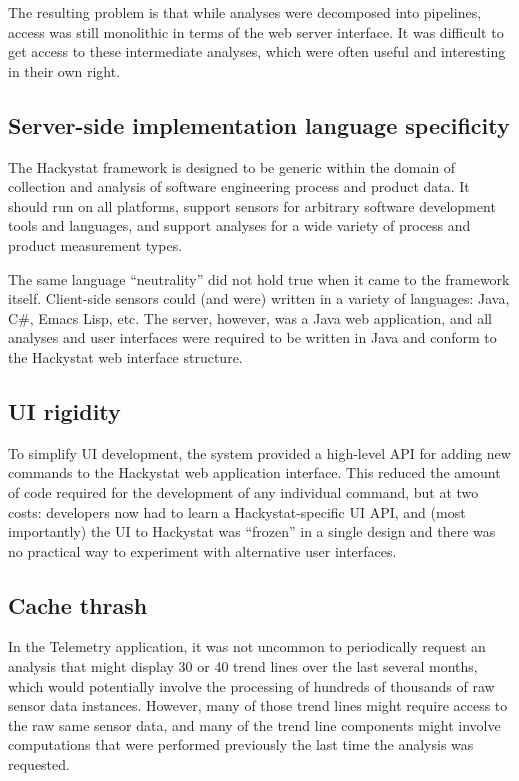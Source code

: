 \documentclass[conference,compsoc,peerreview]{IEEEtran}
\begin{document}
The resulting problem is that while analyses were decomposed into pipelines, access was still monolithic in terms of the web server interface. It was difficult to get access to these intermediate analyses, which were often useful and interesting in their own right. 

\subsection{Server-side implementation language specificity}

The Hackystat framework is designed to be generic within the domain of collection and analysis of software engineering process and product data.  It should run on all platforms, support sensors for arbitrary software development tools and languages, and support analyses for a wide variety of process and product measurement types. 

The same language ``neutrality'' did not hold true when it came to the framework itself.  Client-side sensors could (and were) written in a variety of languages: Java, C\#, Emacs Lisp, etc. The server, however, was a Java web application, and all analyses and user interfaces were required to be written in Java and conform to the Hackystat web interface structure.  

\subsection{UI rigidity}

To simplify UI development, the system provided a high-level API for adding
new commands to the Hackystat web application interface.  This reduced the
amount of code required for the development of any individual command, but
at two costs: developers now had to learn a Hackystat-specific UI API, and
(most importantly) the UI to Hackystat was ``frozen'' in a single design
and there was no practical way to experiment with alternative user
interfaces.

\subsection{Cache thrash}

In the Telemetry application, it was not uncommon to periodically request an analysis that might display 30 or 40 trend lines over the last several months, which would potentially involve the processing of hundreds of thousands of raw sensor data instances. However, many of those trend lines might require access to the raw same sensor data, and many of the trend line components might involve computations that were performed previously the last time the analysis was requested.  
\end{document}
